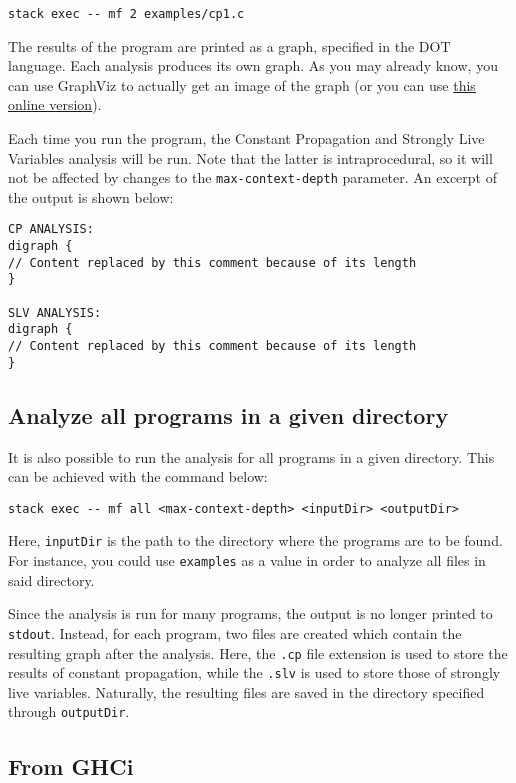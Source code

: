 \documentclass{article}
\begin{document}
\begin{verbatim}
stack exec -- mf 2 examples/cp1.c
\end{verbatim}

The results of the program are printed as a graph, specified in the DOT language.
Each analysis produces its own graph.
As you may already know, you can use GraphViz to actually get an image of the graph (or you can use \href{http://www.webgraphviz.com/}{this online version}).

Each time you run the program, the Constant Propagation and Strongly Live Variables analysis will be run.
Note that the latter is intraprocedural, so it will not be affected by changes to the \texttt{max-context-depth} parameter.
An excerpt of the output is shown below:

\begin{verbatim}
CP ANALYSIS:
digraph {
// Content replaced by this comment because of its length
}

SLV ANALYSIS:
digraph {
// Content replaced by this comment because of its length
}
\end{verbatim}

\subsection*{Analyze all programs in a given directory}

It is also possible to run the analysis for all programs in a given directory. This can be achieved with the command below:

\begin{verbatim}
stack exec -- mf all <max-context-depth> <inputDir> <outputDir>
\end{verbatim}

Here, \texttt{inputDir} is the path to the directory where the programs are to be found. For instance, you could use \texttt{examples} as a value in order to analyze all files in said directory.

Since the analysis is run for many programs, the output is no longer printed to \texttt{stdout}. Instead, for each program, two files are created which contain the resulting graph after the analysis. Here, the \texttt{.cp} file extension is used to store the results of constant propagation, while the \texttt{.slv} is used to store those of strongly live variables. Naturally, the resulting files are saved in the directory specified through \texttt{outputDir}.

\subsection*{From GHCi}
\end{document}
